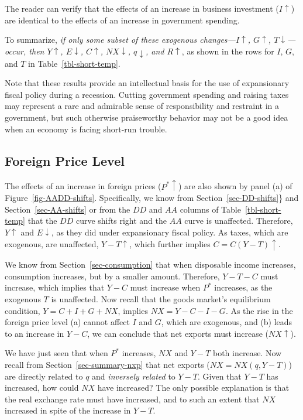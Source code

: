 \documentclass[
  letterpaper,
]{book}
\theoremstyle{plain}
\theoremstyle{remark}
\begin{document}
The reader can verify that the effects of an increase in business
investment (\(I\uparrow\)) are identical to the effects of an increase
in government spending.

To summarize, \emph{if only some subset of these exogenous
changes---\(I\uparrow\), \(G\uparrow\), \(T\downarrow\)---occur, then
\(Y\uparrow\), \(E\downarrow\), \(C\uparrow\), \(NX\downarrow\),
\(q\downarrow\), and \(R\uparrow\)}, as shown in the rows for \(I\),
\(G\), and \(T\) in Table~\ref{tbl-short-temp}.

Note that these results provide an intellectual basis for the use of
expansionary fiscal policy during a recession. Cutting government
spending and raising taxes may represent a rare and admirable sense of
responsibility and restraint in a government, but such otherwise
praiseworthy behavior may not be a good idea when an economy is facing
short-run trouble.

\subsection{Foreign Price Level}\label{sec-pstar-short-temp}

The effects of an increase in foreign prices (\(P^*\uparrow\)) are also
shown by panel (a) of Figure~\ref{fig-AADD-shifts}. Specifically, we
know from Section~\ref{sec-DD-shifts}\} and Section~\ref{sec-AA-shifts}
or from the \(DD\) and \(AA\) columns of Table~\ref{tbl-short-temp} that
the \(DD\) curve shifts right and the \(AA\) curve is unaffected.
Therefore, \(Y\uparrow\) and \(E\downarrow\), as they did under
expansionary fiscal policy. As taxes, which are exogenous, are
unaffected, \(Y-T\uparrow\), which further implies \(C=C(Y-T)\uparrow\).

We know from Section~\ref{sec-consumption} that when disposable income
increases, consumption increases, but by a smaller amount. Therefore,
\(Y-T-C\) must increase, which implies that \(Y-C\) must increase when
\(P^*\) increases, as the exogenous \(T\) is unaffected. Now recall that
the goods market's equilibrium condition, \(Y=C+I+G+NX\), implies
\(NX=Y-C-I-G\). As the rise in the foreign price level (a) cannot affect
\(I\) and \(G\), which are exogenous, and (b) leads to an increase in
\(Y-C\), we can conclude that net exports must increase
(\(NX\uparrow\)).

We have just seen that when \(P^*\) increases, \(NX\) and \(Y-T\) both
increase. Now recall from Section~\ref{sec-summary-nxp} that net exports
(\(NX=NX(q, Y-T)\)) are directly related to \(q\) and \emph{inversely
related} to \(Y-T\). Given that \(Y-T\) has increased, how could \(NX\)
have increased? The only possible explanation is that the real exchange
rate must have increased, and to such an extent that \(NX\) increased in
spite of the increase in \(Y-T\).
\end{document}
